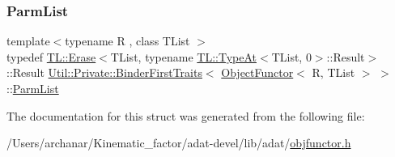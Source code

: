 \mbox{\label{structUtil_1_1Private_1_1BinderFirstTraits_3_01ObjectFunctor_3_01R_00_01TList_01_4_01_4_a181ef1a7b945beef449f25ba47f49bbc}} 
\subsubsection{\texorpdfstring{ParmList}{ParmList}\hspace{0.1cm}{\footnotesize\ttfamily [3/3]}}
{\footnotesize\ttfamily template$<$typename R , class T\+List $>$ \\
typedef \mbox{\hyperlink{structUtil_1_1TL_1_1Erase}{T\+L\+::\+Erase}}$<$T\+List, typename \mbox{\hyperlink{structUtil_1_1TL_1_1TypeAt}{T\+L\+::\+Type\+At}}$<$T\+List, 0$>$\+::Result$>$\+::Result \mbox{\hyperlink{structUtil_1_1Private_1_1BinderFirstTraits}{Util\+::\+Private\+::\+Binder\+First\+Traits}}$<$ \mbox{\hyperlink{classUtil_1_1ObjectFunctor}{Object\+Functor}}$<$ R, T\+List $>$ $>$\+::\mbox{\hyperlink{structUtil_1_1Private_1_1BinderFirstTraits_3_01ObjectFunctor_3_01R_00_01TList_01_4_01_4_a181ef1a7b945beef449f25ba47f49bbc}{Parm\+List}}}



The documentation for this struct was generated from the following file\+:\begin{DoxyCompactItemize}
\item 
/\+Users/archanar/\+Kinematic\+\_\+factor/adat-\/devel/lib/adat/\mbox{\hyperlink{adat-devel_2lib_2adat_2objfunctor_8h}{objfunctor.\+h}}\end{DoxyCompactItemize}
